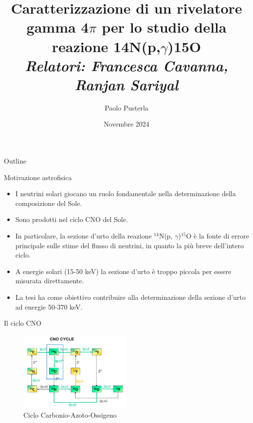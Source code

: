 \documentclass [xcolor=svgnames] {beamer}
\title[Short Title]{Caratterizzazione di un rivelatore gamma 4$\pi$ per lo studio della reazione 14N(p,$\gamma$)15O \\ \textit{Relatori: Francesca Cavanna, Ranjan Sariyal}}
\author[P. Pusterla]{Paolo Pusterla}
\institute[UniTo]{Università degli Studi di Torino}
\date{Novembre 2024}
\begin{document}
	
	\begin{frame}
		\titlepage
	\end{frame}
	
	\begin{frame}{Outline}
		\tableofcontents
	\end{frame}
	
	
	
	\begin{frame}{Motivazione astrofisica}
		\begin{itemize}
			\item<1-> I neutrini solari giocano un ruolo fondamentale nella determinazione della composizione del Sole.
			\item<2-> Sono prodotti nel ciclo CNO del Sole.
			\item<3-> In particolare, la sezione d'urto della reazione $^{14}$N(p, $\gamma$)$^{15}$O è la fonte di errore principale sulle stime del flusso di neutrini, in quanto la più breve dell'intero ciclo.
			\item<4-> A energie solari (15-50 keV) la sezione d'urto è troppo piccola per essere misurata direttamente.
			\item<5-> La tesi ha come obiettivo contribuire alla determinazione della sezione d'urto ad energie 50-370 keV.
		\end{itemize}
	\end{frame}
		
	\begin{frame}{Il ciclo CNO}
		\begin{figure}[H]
			\includegraphics[width=0.5\textwidth]{img/CNO_Cycle.png}
			\caption{Ciclo Carbonio-Azoto-Ossigeno}
		\end{figure}
	\end{frame}
	
\end{document}
